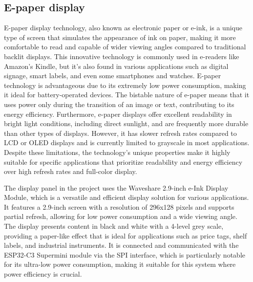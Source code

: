 \documentclass[../Main.tex]{subfiles}
\begin{document}
\subsection{E-paper display}
E-paper display technology, also known as electronic paper or e-ink, is a unique type of screen that simulates the appearance of ink on paper, making it more comfortable to read and capable of wider viewing angles compared to traditional backlit displays. This innovative technology is commonly used in e-readers like Amazon's Kindle, but it's also found in various applications such as digital signage, smart labels, and even some smartphones and watches. E-paper technology is advantageous due to its extremely low power consumption, making it ideal for battery-operated devices. The bistable nature of e-paper means that it uses power only during the transition of an image or text, contributing to its energy efficiency. Furthermore, e-paper displays offer excellent readability in bright light conditions, including direct sunlight, and are frequently more durable than other types of displays. However, it has slower refresh rates compared to LCD or OLED displays and is currently limited to grayscale in most applications. Despite these limitations, the technology's unique properties make it highly suitable for specific applications that prioritize readability and energy efficiency over high refresh rates and full-color display.

The display panel in the project uses the Waveshare 2.9-inch e-Ink Display Module, which is a versatile and efficient display solution for various applications. It features a 2.9-inch screen with a resolution of 296x128 pixels and supports partial refresh, allowing for low power consumption and a wide viewing angle. The display presents content in black and white with a 4-level grey scale, providing a paper-like effect that is ideal for applications such as price tags, shelf labels, and industrial instruments. It is connected and communicated with the ESP32-C3 Supermini module via the SPI interface, which is particularly notable for its ultra-low power consumption, making it suitable for this system where power efficiency is crucial.
\end{document}
